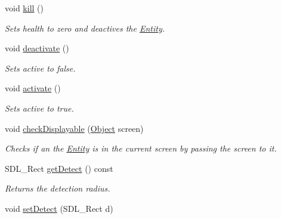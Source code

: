 \begin{DoxyCompactItemize}
\mbox{\label{classEntity_a522648b330daab91b49f78f0737a943f}} 
void \hyperlink{classEntity_a522648b330daab91b49f78f0737a943f}{kill} ()
\begin{DoxyCompactList}\small\item\em Sets health to zero and deactives the \hyperlink{classEntity}{Entity}. \end{DoxyCompactList}\item 
\mbox{\label{classEntity_aa409e70e0f5abb2ac1314f8745b9a661}} 
void \hyperlink{classEntity_aa409e70e0f5abb2ac1314f8745b9a661}{deactivate} ()
\begin{DoxyCompactList}\small\item\em Sets active to false. \end{DoxyCompactList}\item 
\mbox{\label{classEntity_a95079be1c9fa9f109dd3cf7446eeeb1d}} 
void \hyperlink{classEntity_a95079be1c9fa9f109dd3cf7446eeeb1d}{activate} ()
\begin{DoxyCompactList}\small\item\em Sets active to true. \end{DoxyCompactList}\item 
\mbox{\label{classEntity_a63aac9638f79f0608b08f28b8cdc718e}} 
void \hyperlink{classEntity_a63aac9638f79f0608b08f28b8cdc718e}{check\+Displayable} (\hyperlink{classObject}{Object} screen)
\begin{DoxyCompactList}\small\item\em Checks if an the \hyperlink{classEntity}{Entity} is in the current screen by passing the screen to it. \end{DoxyCompactList}\item 
\mbox{\label{classEntity_a2ea4a13ae5345fb4bb0ccc299011e209}} 
S\+D\+L\+\_\+\+Rect \hyperlink{classEntity_a2ea4a13ae5345fb4bb0ccc299011e209}{get\+Detect} () const
\begin{DoxyCompactList}\small\item\em Returns the detection radius. \end{DoxyCompactList}\item 
\mbox{\label{classEntity_a7624a9b21bbb1bd97d7f2eac20339a82}} 
void \hyperlink{classEntity_a7624a9b21bbb1bd97d7f2eac20339a82}{set\+Detect} (S\+D\+L\+\_\+\+Rect d)

\end{DoxyCompactItemize}
